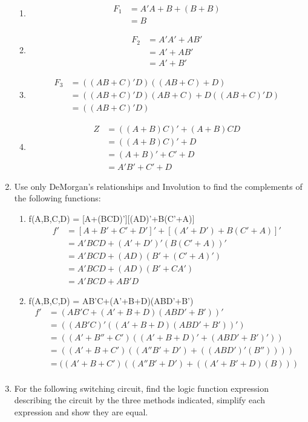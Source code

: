 \documentclass[12pt]{article}
\begin{document}
\begin{enumerate}
    \begin{enumerate}
        \item 
        \begin{align*}
         F_1&=A'A+B+(B+B)\\
         &=B
        \end{align*}
        \item
        \begin{align*}
            F_2 &= A'A'+AB'\\
            &= A'+AB'\\
            &= A'+B'
        \end{align*}
        \item
        \begin{align*}
            F_3 &= ((AB+C)'D)((AB+C)+D)\\
            &= ((AB+C)'D)(AB+C)+D((AB+C)'D)\\
            &= ((AB+C)'D)
        \end{align*}
        \item
        \begin{align*}
            Z &=((A+B)C)'+(A+B)CD\\
            &= ((A+B)C)' + D\\
            &= (A+B)'+C'+D\\
            &= A'B'+C'+D
        \end{align*}
    \end{enumerate}
    \addtocounter{enumi}{1}\item Use only DeMorgan's relationships and Involution to find the complements of the following functions:
    \begin{enumerate}
        \item f(A,B,C,D) = [A+(BCD)'][(AD)'+B(C'+A)]
        \begin{align*}
            f' &= [A+B'+C'+D']'+[(A'+D')+B(C'+A)]'\\
            &= A'BCD+(A'+D')'(B(C'+A))'\\
            &= A'BCD+(AD)(B'+(C'+A)')\\
            &= A'BCD+(AD)(B'+CA')\\
            &= A'BCD+AB'D
        \end{align*}
        \item f(A,B,C,D) = AB'C+(A'+B+D)(ABD'+B')
        \begin{align*}
            f' &=  (AB'C+(A'+B+D)(ABD'+B'))'\\
            &=  ((AB'C)'((A'+B+D)(ABD'+B'))')\\
            &=  ((A'+B''+C')((A'+B+D)'+(ABD'+B')'))\\
            &=  ((A'+B+C')((A''B'+D')+((ABD')'(B''))))\\
            &=  ((A'+B+C')((A''B'+D')+((A'+B'+D)(B)))\\
        \end{align*}
    \end{enumerate}
      \addtocounter{enumi}{1}\item For the following switching circuit, find the logic function expression describing the circuit by the three methods indicated, simplify each expression and show they are equal. 
\end{enumerate}
\end{document}
